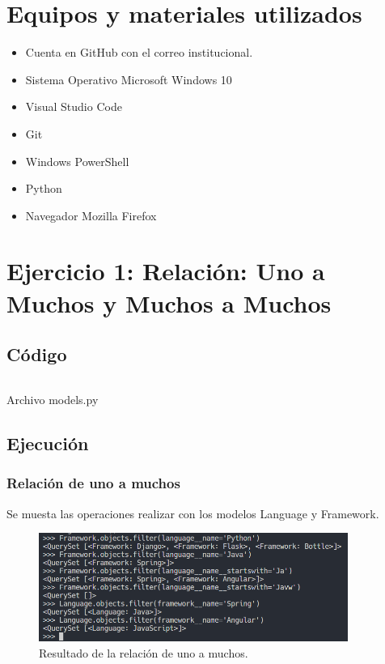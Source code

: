 \documentclass{article}
\newenvironment{block}{\captionsetup{type=listing}}{}
\begin{document}
\section{Equipos y materiales utilizados}
\begin{itemize}
	\item Cuenta en GitHub con el correo institucional.
	\item Sistema Operativo Microsoft Windows 10
	\item Visual Studio Code
	\item Git
	\item Windows PowerShell
	\item Python
	\item Navegador Mozilla Firefox
\end{itemize}
\pagebreak

\section{Ejercicio 1: Relación: Uno a Muchos y Muchos a Muchos}
\subsection{Código}
\begin{block}
	\inputminted{python}{../relations_examples/example/models.py}
	\caption{Archivo models.py}
\end{block}
\subsection{Ejecución}

\subsubsection{Relación de uno a muchos}
Se muesta las operaciones realizar con los modelos Language y Framework.
\begin{figure}[H]
	\centering
	\includegraphics[width=0.9\textwidth,keepaspectratio]{img/r1operaciones.png}
	\caption{Resultado de la relación de uno a muchos.}
\end{figure}
\end{document}
